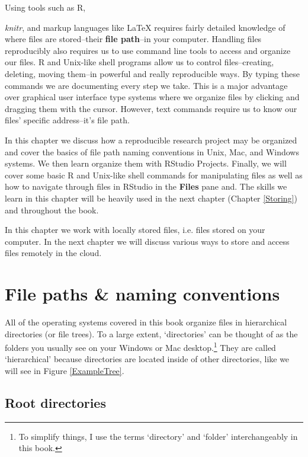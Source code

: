 Using tools such as R, {\emph{knitr}, and markup languages like LaTeX requires fairly detailed knowledge of where files are stored--their {\bf{file path}}--in your computer. Handling files reproducibly also requires us to use command line tools to access and organize our files. R and Unix-like shell programs allow us to control files--creating, deleting, moving them--in powerful and really reproducible ways. By typing these commands we are documenting every step we take. This is a major advantage over graphical user interface type systems where we organize files by clicking and dragging them with the cursor. However, text commands require us to know our files' specific address--it's file path. 

In this chapter we discuss how a reproducible research project may be organized and cover the basics of file path naming conventions in Unix, Mac, and Windows systems. We then learn organize them with RStudio Projects. Finally, we will cover some basic R and Unix-like shell commands for manipulating files as well as how to navigate through files in RStudio in the {\bf{Files}} pane and. The skills we learn in this chapter will be heavily used in the next chapter (Chapter \ref{Storing}) and throughout the book.

In this chapter we work with locally stored files, i.e. files stored on your computer. In the next chapter we will discuss various ways to store and access files remotely in the cloud.


\section{File paths \& naming conventions}

All of the operating systems covered in this book organize files in hierarchical directories (or file trees). To a large extent, `directories' can be thought of as the folders you usually see on your Windows or Mac desktop.\footnote{To simplify things, I use the terms `directory' and `folder' interchangeably in this book.} They are called `hierarchical' because directories are located inside of other directories, like we will see in Figure \ref{ExampleTree}. 

\subsection{Root directories}

}
